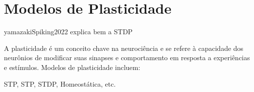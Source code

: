 \section{Modelos de Plasticidade}

yamazakiSpiking2022 explica bem a STDP



A plasticidade é um conceito chave na neurociência e se refere à capacidade dos neurônios de modificar suas sinapses e
comportamento em resposta a experiências e estímulos. Modelos de plasticidade incluem:

STP, STP, STDP, Homeostática, etc.

